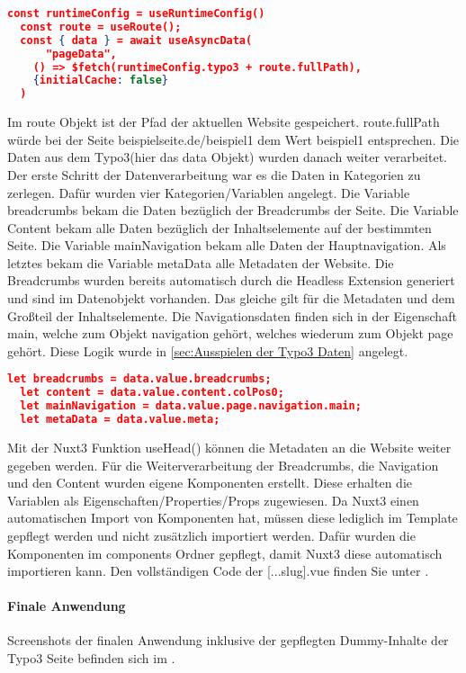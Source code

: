 \begin{lstlisting}[language=json,firstnumber=1]
  const runtimeConfig = useRuntimeConfig()
  const route = useRoute();
  const { data } = await useAsyncData(
      "pageData",
    () => $fetch(runtimeConfig.typo3 + route.fullPath),
    {initialCache: false}
  )
\end{lstlisting}

Im route Objekt ist der Pfad der aktuellen Website gespeichert. route.fullPath würde bei der Seite beispielseite.de/beispiel1 dem Wert beispiel1 entsprechen.
Die Daten aus dem Typo3(hier das data Objekt) wurden danach weiter verarbeitet. Der erste Schritt der Datenverarbeitung war es die Daten in Kategorien zu zerlegen. Dafür wurden vier Kategorien/Variablen angelegt. Die Variable breadcrumbs bekam die Daten bezüglich der Breadcrumbs der Seite. Die Variable Content bekam alle Daten bezüglich der Inhaltselemente auf der bestimmten Seite. Die Variable mainNavigation bekam alle Daten der Hauptnavigation. Als letztes bekam die Variable metaData alle Metadaten der Website. Die Breadcrumbs wurden bereits automatisch durch die Headless Extension generiert und sind im Datenobjekt vorhanden. Das gleiche gilt für die Metadaten und dem Großteil der Inhaltselemente. Die Navigationsdaten finden sich in der Eigenschaft main, welche zum Objekt navigation gehört, welches wiederum zum Objekt page gehört. Diese Logik wurde in \ref{sec:Ausspielen der Typo3 Daten} angelegt.

\begin{lstlisting}[language=json,firstnumber=1]
  let breadcrumbs = data.value.breadcrumbs;
  let content = data.value.content.colPos0;
  let mainNavigation = data.value.page.navigation.main;
  let metaData = data.value.meta;
\end{lstlisting}

Mit der Nuxt3 Funktion useHead() können die Metadaten an die Website weiter gegeben werden. Für die Weiterverarbeitung der Breadcrumbs, die Navigation und den Content wurden eigene Komponenten erstellt. Diese erhalten die Variablen als Eigenschaften/Properties/Props zugewiesen. Da Nuxt3 einen automatischen Import von Komponenten hat, müssen diese lediglich im Template gepflegt werden und nicht zusätzlich importiert werden. Dafür wurden die Komponenten im components Ordner gepflegt, damit Nuxt3 diese automatisch importieren kann. Den vollständigen Code der [...slug].vue finden Sie unter .

\paragraph{Finale Anwendung}
Screenshots der finalen Anwendung inklusive der gepflegten Dummy-Inhalte der Typo3 Seite befinden sich im .


